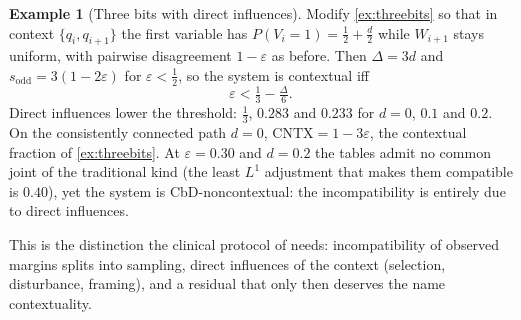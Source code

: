 \documentclass[11pt]{article}
\theoremstyle{definition}
\newtheorem{example}[theorem]{Example}
\theoremstyle{remark}
\begin{document}
\begin{example}[Three bits with direct influences]\label{ex:cbd3}
Modify \cref{ex:threebits} so that in context $\{q_i,q_{i+1}\}$ the first variable has $P(V_i=1)=\frac12+\frac d2$ while $W_{i+1}$ stays uniform,
with pairwise disagreement $1-\varepsilon$ as before. Then $\Delta=3d$ and $s_{\mathrm{odd}}=3(1-2\varepsilon)$ for $\varepsilon<\frac12$, so the system is
contextual iff
\[
\varepsilon<\tfrac13-\tfrac{\Delta}6 .
\]
Direct influences lower the threshold: $\frac13$, $0.283$ and $0.233$ for $d=0$, $0.1$ and $0.2$. On the consistently connected path $d=0$,
$\mathrm{CNTX}=1-3\varepsilon$, the contextual fraction of \cref{ex:threebits}. At $\varepsilon=0.30$ and $d=0.2$ the tables admit no common joint of the
traditional kind (the least $L^1$ adjustment that makes them compatible is $0.40$), yet the system is CbD-noncontextual: the
incompatibility is entirely due to direct influences.
\end{example}

This is the distinction the clinical protocol of \cite[\S11]{Bands} needs: incompatibility of observed margins splits into sampling,
direct influences of the context (selection, disturbance, framing), and a residual that only then deserves the name contextuality.
\end{document}
